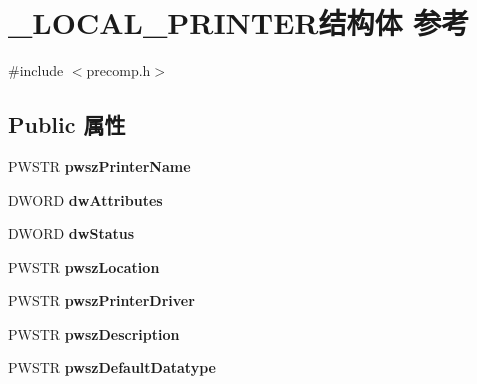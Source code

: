\hypertarget{struct___l_o_c_a_l___p_r_i_n_t_e_r}{}\section{\+\_\+\+L\+O\+C\+A\+L\+\_\+\+P\+R\+I\+N\+T\+E\+R结构体 参考}
\label{struct___l_o_c_a_l___p_r_i_n_t_e_r}


{\ttfamily \#include $<$precomp.\+h$>$}

\subsection*{Public 属性}
\begin{DoxyCompactItemize}
\item 
\mbox{\label{struct___l_o_c_a_l___p_r_i_n_t_e_r_a231c1dbff8c5861d302076c069f6bb75}} 
P\+W\+S\+TR {\bfseries pwsz\+Printer\+Name}
\item 
\mbox{\label{struct___l_o_c_a_l___p_r_i_n_t_e_r_a57cb3e8561c2a80107f7e35c31695264}} 
D\+W\+O\+RD {\bfseries dw\+Attributes}
\item 
\mbox{\label{struct___l_o_c_a_l___p_r_i_n_t_e_r_af411f3c6d44bd6f8db74da5284de75fe}} 
D\+W\+O\+RD {\bfseries dw\+Status}
\item 
\mbox{\label{struct___l_o_c_a_l___p_r_i_n_t_e_r_a76f78d157ee5d0690d787ebe74d04a74}} 
P\+W\+S\+TR {\bfseries pwsz\+Location}
\item 
\mbox{\label{struct___l_o_c_a_l___p_r_i_n_t_e_r_a47375f6363bb35e1b1faece7509ab15e}} 
P\+W\+S\+TR {\bfseries pwsz\+Printer\+Driver}
\item 
\mbox{\label{struct___l_o_c_a_l___p_r_i_n_t_e_r_a827aa8719fdee0424a7954874be61b3e}} 
P\+W\+S\+TR {\bfseries pwsz\+Description}
\item 
\mbox{\label{struct___l_o_c_a_l___p_r_i_n_t_e_r_a192d8f69d059f33521216072c498d9d7}} 
P\+W\+S\+TR {\bfseries pwsz\+Default\+Datatype}
\item 

\end{DoxyCompactItemize}
